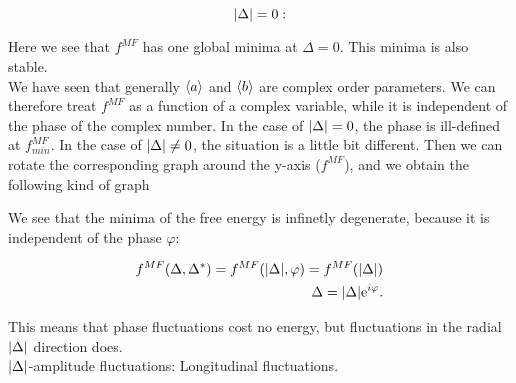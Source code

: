 \begin{equation*}
     \abs{\Delta} = 0:
\end{equation*}


Here we see that $f^{MF}$ has one global minima at $\Delta = 0$. This minima is also stable. \\

We have seen that generally $\expval{a}$ and $\expval{b}$ are complex order parameters. We can therefore treat $f^{MF}$ as a function of a complex variable, while it is independent of the phase of the complex number. In the case of $\abs{\Delta} = 0$, the phase is ill-defined at $f^{MF}_{min}$. In the case of $\abs{\Delta} \neq 0$, the situation is a little bit different. Then we can rotate the corresponding graph around the y-axis ($f^{MF}$), and we obtain the following kind of graph

%     


We see that the minima of the free energy is infinetly degenerate, because it is independent of the phase $\varphi$: 

\begin{align*}
    f^{MF}(\Delta, \Delta^*) = f^{MF}(\abs{\Delta}, \varphi) = f^{MF}(\abs{\Delta}) \\
    \Delta = \abs{\Delta}\mathrm{e}^{i\varphi}. 
\end{align*}

This means that phase fluctuations cost no energy, but fluctuations in the radial $\abs{\Delta}$ direction does. \\ 

$\abs{\Delta}$-amplitude fluctuations: Longitudinal fluctuations. \\ 

